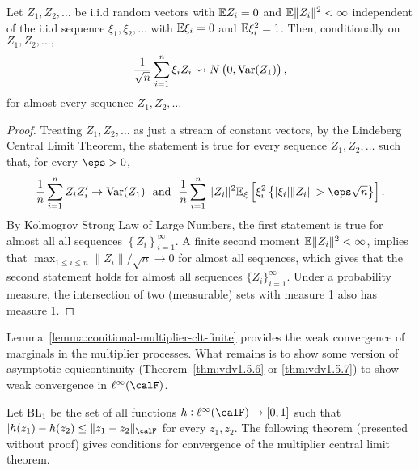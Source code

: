 \begin{lemma}
	\label{lemma:conitional-multiplier-clt-finite}
	Let \(Z_1,Z_2,\dots\) be i.i.d random vectors with \(\mathbb{E} Z_i =0\) and \(\mathbb{E}\|Z_i\|^2 <\infty\) independent of the i.i.d sequence \(\xi_1,\xi_2,\dots\) with \(\mathbb{E}\xi_i=0\) and \(\mathbb{E}\xi_i^2=1\). Then, conditionally on \(Z_1,Z_2,\dots,\)
	\[
		\frac{1}{\sqrt{n}}\sum_{i=1}^n \xi_iZ_i\rightsquigarrow N\left(0, \operatorname{Var}(Z_1)\right)
	,\]
	for almost every sequence \(Z_1,Z_2,\dots\)
\end{lemma}
\begin{proof}
	Treating \(Z_1,Z_2,\dots\) as just a stream of constant vectors, by the Lindeberg Central Limit Theorem, the statement is true for every sequence \(Z_1,Z_2,\dots\) such that, for every \(\eps > 0\),
	\[
		\frac{1}{n} \sum_{i=1}^n Z_iZ_i'\to \Var(Z_1)\andbox \frac{1}{n}\sum_{i=1}^n \|Z_i\|^2\E_\xi\left[\xi_i^2\left\{|\xi_i|\|Z_i\| > \eps\sqrt{n}\right\}\right]
	.\]
	By Kolmogrov Strong Law of Large Numbers, the first statement is true for almost all all sequences \(\left\{Z_i\right\}_{i=1}^\infty\). A finite second moment \(\mathbb{E}\|Z_i\|^2 <\infty\), implies that \(\max_{1\leq i\leq n}\|Z_i\|/\sqrt{n}\to0\) for almost all sequences, which gives that the second statement holds for almost all sequences \(\{Z_i\}_{i=1}^\infty\). Under a probability measure, the intersection of two (measurable) sets with measure 1 also has measure 1.
\end{proof}

Lemma~\ref{lemma:conitional-multiplier-clt-finite} provides the weak convergence of marginals in the multiplier processes. What remains is to show some version of asymptotic equicontinuity (Theorem~\ref{thm:vdv1.5.6} or \ref{thm:vdv1.5.7}) to show weak convergence in \(\ell^\infty(\calF)\). 

Let \(\text{BL}_1\) be the set of all functions \(h:\ell^\infty(\calF)\to[0,1]\) such that \(|h(z_1)-h(z_2)\leq \|z_1-z_2\|_\calF\) for every \(z_1,z_2\). The following theorem (presented without proof) gives conditions for convergence of the multiplier central limit theorem. 

